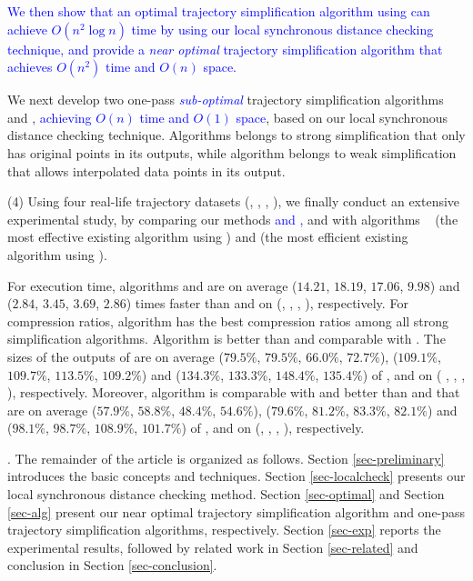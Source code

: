  \textcolor{blue}{We then show that an optimal trajectory simplification algorithm using \sed can achieve $O(n^2 \log n)$ time by using our local synchronous distance checking technique, and provide a \textit{near optimal} trajectory simplification algorithm \cisto that achieves $O(n^2)$ time and $O(n)$ space.}

 We next develop two one-pass \textcolor{blue}{\textit{sub-optimal}} trajectory simplification algorithms \cist and \cista, \textcolor{blue}{achieving $O(n)$ time and $O(1)$ space}, based on our local synchronous distance checking technique. 
Algorithms \cist belongs to strong simplification that only has original points in its outputs, while algorithm \cista belongs to weak simplification that allows interpolated data points in its output.


\sstab (4) Using four real-life trajectory datasets (\truck, \sercar, \geolife, \pricar),
we finally conduct an extensive experimental study, by comparing our methods \textcolor{blue}{and \cisto,} \cist and \cista  with algorithms \dps~\cite{Meratnia:Spatiotemporal} (the most effective existing \lsa algorithm using \sed) and \squishe \cite{Muckell:Compression} (the most efficient existing \lsa algorithm using \sed).

{For execution time,} algorithms \cist and \cista are on average ($14.21$, $18.19$, $17.06$, $9.98$) and ($2.84$, $3.45$, $3.69$, $2.86$) times faster than \dps and \squishe on (\sercar, \geolife, \mopsi, \pricar), respectively.
%
For compression ratios, algorithm \cisto has the best compression ratios among all strong simplification algorithms.
Algorithm \cist is better than \squishe and comparable with \dps. The sizes of
the outputs of \cist are on average ($79.5\%$, $79.5\%$, $66.0\%$, $72.7\%$),
($109.1\%$, $109.7\%$, $113.5\%$, $109.2\%$) and {($134.3\%$, $133.3\%$,
  $148.4\%$, $135.4\%$)} of \squishe, \dps and \cisto on ( \sercar, \geolife, \mopsi, \pricar), respectively. 
Moreover, algorithm \cista is comparable with \cisto and better than \squishe
and \dps  that are on average ($57.9\%$, $58.8\%$, $48.4\%$, $54.6\%$),
($79.6\%$, $81.2\%$, $83.3\%$, $82.1\%$) and {($98.1\%$, $98.7\%$, $108.9\%$,
  $101.7\%$)} of \squishe, \dps and \cisto on (\sercar, \geolife, \mopsi, \pricar), respectively.


.
The remainder of the article is organized as follows.
Section \ref{sec-preliminary} introduces the basic concepts and techniques.
Section \ref{sec-localcheck} presents our local synchronous distance checking method.
Section \ref{sec-optimal} and Section \ref{sec-alg} present our near optimal trajectory simplification algorithm and one-pass trajectory simplification algorithms, respectively.
Section \ref{sec-exp} reports the experimental results, followed by related work in
Section \ref{sec-related} and conclusion in Section \ref{sec-conclusion}.





